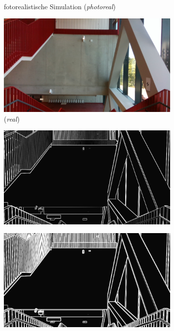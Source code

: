 \begin{figure}
\begin{subfigure}[t]{0.24\linewidth}
		\caption{\RaggedRight fotorealistische Simulation \hspace{2cm} (\textit{photoreal})}
		\label{subfig:photorealistic}
	\end{subfigure}
	\hfill 
	\begin{subfigure}[t]{0.24\linewidth}
		\centering
		\includegraphics[width=\linewidth]{images/syn_dataset/r000089.png}
		\caption{ \hspace{2cm} (\textit{real})}
		\label{subfig:real}
	\end{subfigure}
	\hfill 
	\medskip
	\begin{subfigure}[t]{0.24\linewidth}
		\centering
		\includegraphics[width=\linewidth]{images/syn_dataset/bg00188.png}
		\caption{}
	\end{subfigure}
	\hfill
	\begin{subfigure}[t]{0.24\linewidth}
		\centering
		\includegraphics[width=\linewidth]{images/syn_dataset/eg00188.png}

\end{subfigure}
\end{figure}
